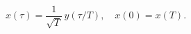 \begin{equation}
x(\tau)=\frac{1}{\sqrt{T}}\, y(\tau/T), \quad x(0)=x(T). \label{wn4}
\end{equation}

